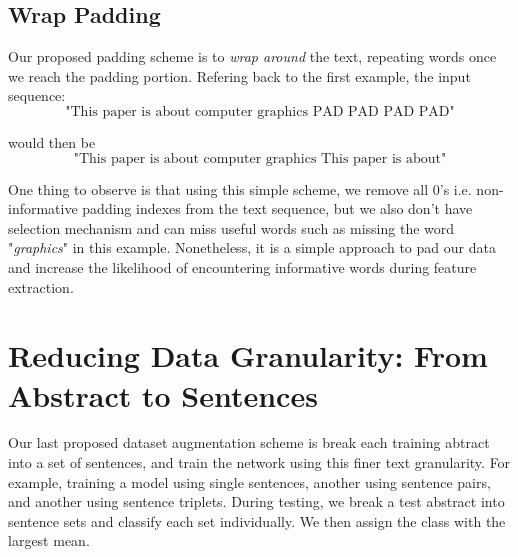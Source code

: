 \subsection{Wrap Padding}
Our proposed padding scheme is to \textit{wrap around} the text, repeating words once we reach the padding portion.
Refering back to the first example, the input sequence:
\[\text{"This paper is about computer graphics PAD PAD PAD PAD"}\]

would then be
\[\text{"This paper is about computer graphics This paper is about"}\]

One thing to observe is that using this simple scheme, we remove all 0's i.e. non-informative padding indexes
from the text sequence, but we also don't have selection mechanism and can miss useful words such as missing the
word "\textit{graphics}" in this example. Nonetheless, it is a simple approach to pad our data and increase the likelihood of encountering informative
words during feature extraction.


\section{Reducing Data Granularity: From Abstract to Sentences}
Our last proposed dataset augmentation scheme is break each training abtract into a set of sentences, and train
the network using this finer text granularity. For example, training a model using single sentences, another using sentence pairs,
and another using sentence triplets.
During testing, we break a test abstract into sentence sets and classify each set individually. We then assign
the class with the largest mean.
